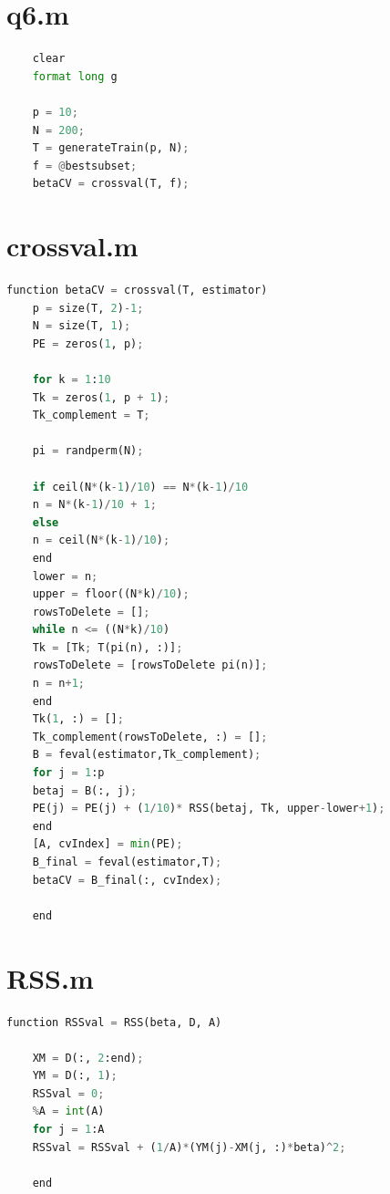\documentclass{article}
\begin{document}
\section{q6.m}
\label{ap:q6}
\begin{lstlisting}[language=python]
	%programs for q6: q6.m, crossval.m, RSS.m, generateTrain.m, bestsubset.m
	clear
	format long g
	
	p = 10;
	N = 200;
	T = generateTrain(p, N);
	f = @bestsubset;
	betaCV = crossval(T, f);
\end{lstlisting}

\section{crossval.m}
\label{ap:crossval}
\begin{lstlisting}[language=python]
	function betaCV = crossval(T, estimator)
	p = size(T, 2)-1;
	N = size(T, 1);
	PE = zeros(1, p);
	
	for k = 1:10
	Tk = zeros(1, p + 1);
	Tk_complement = T;
	
	pi = randperm(N);
	
	if ceil(N*(k-1)/10) == N*(k-1)/10
	n = N*(k-1)/10 + 1;
	else
	n = ceil(N*(k-1)/10);
	end
	lower = n;
	upper = floor((N*k)/10);
	rowsToDelete = [];
	while n <= ((N*k)/10)
	Tk = [Tk; T(pi(n), :)];
	rowsToDelete = [rowsToDelete pi(n)];
	n = n+1;
	end
	Tk(1, :) = [];
	Tk_complement(rowsToDelete, :) = [];
	B = feval(estimator,Tk_complement);
	for j = 1:p
	betaj = B(:, j);
	PE(j) = PE(j) + (1/10)* RSS(betaj, Tk, upper-lower+1);
	end
	[A, cvIndex] = min(PE);
	B_final = feval(estimator,T);
	betaCV = B_final(:, cvIndex);
	
	end
\end{lstlisting}

\section{RSS.m}
\label{ap:RSS}
\begin{lstlisting}[language=python]
	function RSSval = RSS(beta, D, A)
	
	XM = D(:, 2:end);
	YM = D(:, 1);
	RSSval = 0;
	%A = int(A)
	for j = 1:A
	RSSval = RSSval + (1/A)*(YM(j)-XM(j, :)*beta)^2;
	
	end
\end{lstlisting}
\end{document}
